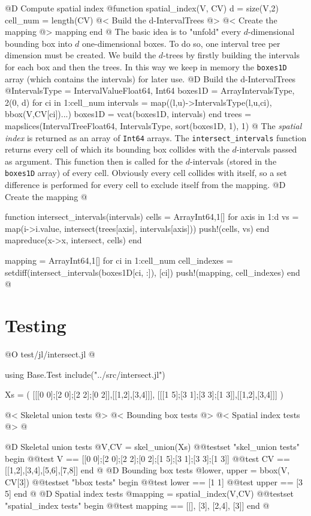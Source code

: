 \documentclass[10pt,oneside]{article}
\begin{document}
@D Compute spatial index
@{function spatial_index(V, CV)
    d = size(V,2)
    cell_num = length(CV)
    @< Build the d-IntervalTrees @>
    @< Create the mapping @>
    mapping
end
@}
The basic idea is to "unfold" every $d$-dimensional bounding box into $d$ one-dimensional boxes.
To do so, one interval tree per dimension must be created. 
We build the $d$-trees by firstly building the intervals for each box and then the trees.
In this way we keep in memory the \texttt{boxes1D} array (which contains the intervals) for later use.
@D Build the d-IntervalTrees
@{IntervalsType = IntervalValue{Float64, Int64}
boxes1D = Array{IntervalsType, 2}(0, d)
for ci in 1:cell_num
    intervals = map((l,u)->IntervalsType(l,u,ci), bbox(V,CV[ci])...)
    boxes1D = vcat(boxes1D, intervals)
end
trees = mapslices(IntervalTree{Float64, IntervalsType}, sort(boxes1D, 1), 1)
@}
The \textit{spatial index} is returned as an array of \texttt{Int64} arrays.
The \texttt{intersect\_intervals} function returns every cell of which its bounding box collides with 
the $d$-intervals passed as argument. This function then is called for the $d$-intervals (stored in the \texttt{boxes1D} array) of every cell.
Obviously every cell collides with itself, so a set difference is performed for every cell to exclude itself from the mapping.
@D Create the mapping
@{function intersect_intervals(intervals)
    cells = Array{Int64,1}[]
    for axis in 1:d
        vs = map(i->i.value, intersect(trees[axis], intervals[axis]))
        push!(cells, vs)
    end
    mapreduce(x->x, intersect, cells)
end

mapping = Array{Int64,1}[]
for ci in 1:cell_num
    cell_indexes = setdiff(intersect_intervals(boxes1D[ci, :]), [ci])
    push!(mapping, cell_indexes)
end
@}

\section{Testing}
@O test/jl/intersect.jl
@{using Base.Test
include("../src/intersect.jl")

Xs = (
    [[[0 0];[2 0];[2 2];[0 2]],[[1,2],[3,4]]],
    [[[1 5];[3 1];[3 3];[1 3]],[[1,2],[3,4]]]
)

@< Skeletal union tests @>
@< Bounding box tests @>
@< Spatial index tests @>
@}
@D Skeletal union tests
@{V,CV = skel_union(Xs)
@@testset "skel_union tests" begin
    @@test V == [[0 0];[2 0];[2 2];[0 2];[1 5];[3 1];[3 3];[1 3]]
    @@test CV == [[1,2],[3,4],[5,6],[7,8]]
end
@}
@D Bounding box tests
@{lower, upper = bbox(V, CV[3])
@@testset "bbox tests" begin
    @@test lower == [1 1]
    @@test upper == [3 5]
end
@}
@D Spatial index tests
@{mapping = spatial_index(V,CV)
@@testset "spatial_index tests" begin
    @@test mapping == [[], [3], [2,4], [3]]
end
@}
\end{document}
